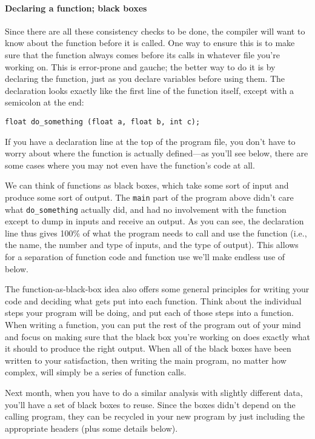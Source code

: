 \documentclass[12pt]{article}
\begin{document}
\paragraph{Declaring a function; black boxes} 
Since there are all these consistency
checks to be done, the compiler will want to know about the function
before it is called. One way to ensure this is to make sure that
the function always comes before its calls in whatever file you're
working on. This is error-prone and gauche; the better way to do it is
by declaring the function, just as you declare variables before using
them. The declaration looks exactly like the first line of the function
itself, except with a semicolon at the end:

\begin{verbatim}
float do_something (float a, float b, int c);
\end{verbatim}

If you have a declaration line at the top of the program file, you don't
have to worry about where the function is actually defined---as
you'll see below, there are some cases where you may not even have the
function's code at all. 

We can think of functions as black boxes, which take some sort of input and produce some sort of output.
The {\tt main} part of the program above didn't care what {\tt do\_something} actually did, and had no
involvement with the function except to dump in inputs and receive an output. As you can see, the
declaration line thus gives 100\% of what the program needs to call and use the function (i.e., the name,
the number and type of inputs, and the type of output). This allows for
a separation of function code and function use we'll make endless use of below.

The function-as-black-box idea also offers some general principles for
writing your code and deciding what gets put into each function. Think
about the individual steps your program will be doing, and put each
of those steps into a function. When writing a function, you
can put the rest of the program out of your mind and focus on making
sure that the black box you're working on does exactly what it should
to produce the right output. When all of the black boxes have been written to
your satisfaction, then writing the main program, no matter how complex,
will simply be a series of function calls.

Next month, when you have to do a similar analysis with slightly different
data, you'll have a set of black boxes to reuse. Since the boxes didn't
depend on the calling program, they can be recycled in your new program
by just including the appropriate headers (plus some details below).
\end{document}

